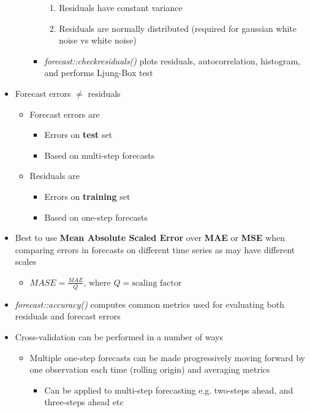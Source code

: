 \documentclass{article}\usepackage[]{graphicx}\usepackage[]{color}
\begin{document}
\begin{itemize}
\begin{itemize}
\begin{itemize}
\begin{enumerate}
                \item Residuals have constant variance
                \item Residuals are normally distributed (required for gaussian white noise vs white noise)
            \end{enumerate}
            \item \textit{forecast::checkresiduals()} plots residuals, autocorrelation, histogram, and performs Ljung-Box test
        \end{itemize}
    \end{itemize}
    \item Forecast errors $\neq$ residuals
    \begin{itemize}
        \item Forecast errors are 
        \begin{itemize}
            \item Errors on \textbf{test} set
            \item Based on multi-step forecasts
        \end{itemize} 
        \item Residuals are 
        \begin{itemize}
            \item Errors on \textbf{training} set
            \item Based on one-step forecasts
        \end{itemize}
    \end{itemize}
    \item Best to use \textbf{Mean Absolute Scaled Error} over \textbf{MAE} or \textbf{MSE} when comparing errors in forecasts on different time series as may have different scales
    \begin{itemize}
        \item $MASE = \frac{MAE}{Q} \text{, where } Q = \text{scaling factor}$
    \end{itemize}
    \item \textit{forecast::accuracy()} computes common metrics used for evaluating both residuals and forecast errors
    \item Cross-validation can be performed in a number of ways
    \begin{itemize}
        \item Multiple one-step forecasts can be made progressively moving forward by one observation each time (rolling origin) and averaging metrics
        \begin{itemize}
            \item Can be applied to multi-step forecasting e.g. two-steps ahead, and three-steps ahead etc

\end{itemize}
\end{itemize}
\end{itemize}
\end{document}
